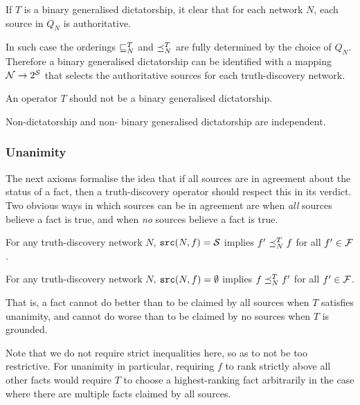 \documentclass[../main.tex]{subfiles}
\begin{document}
\begin{remark}
If $T$ is a binary generalised dictatorship, it clear that for each network
$N$, each source in $Q_N$ is authoritative.

In such case the orderings $\sqsubseteq_N^T$ and $\preceq_N^T$ are fully determined by
the choice of $Q_N$. Therefore a binary generalised dictatorship can be
identified with a mapping $\mathcal{N} \rightarrow 2^{\mathcal{S}}$ that selects the authoritative
sources for each truth-discovery network.
\end{remark}

\begin{axiom}
\label{axiom:non_bin_gen_dict}
An operator $T$ should not be a binary generalised dictatorship.
\end{axiom}

\begin{proposition}
\label{prop:non_dict_and_non_bin_gen_dict_indep}
Non-dictatorship and non- binary generalised dictatorship are independent.
\end{proposition}

\subsubsection{Unanimity}

The next axioms formalise the idea that if all sources are in agreement about
the status of a fact, then a truth-discovery operator should respect this in
its verdict. Two obvious ways in which sources can be in agreement are when
\emph{all} sources believe a fact is true, and when \emph{no} sources believe a
fact is true.

\begin{axiom}[Unanimity]
\label{axiom:unanimity}
For any truth-discovery network $N$, $\texttt{src}(N, f) = \mathcal{S}$ implies $f' \preceq_N^T f$
for all $f' \in \mathcal{F}$.
\end{axiom}

\begin{axiom}[Groundedness]
\label{axiom:groundedness}
For any truth-discovery network $N$, $\texttt{src}(N, f) = \emptyset$ implies $f
\preceq_N^T f'$ for all $f' \in \mathcal{F}$.
\end{axiom}

That is, a fact cannot do better than to be claimed by all sources when $T$
satisfies unanimity, and cannot do worse than to be claimed by no sources when
$T$ is grounded.

Note that we do not require strict inequalities here, so as to not be too
restrictive. For unanimity in particular, requiring $f$ to rank strictly above
all other facts would require $T$ to choose a highest-ranking fact arbitrarily
in the case where there are multiple facts claimed by all sources.
\end{document}
